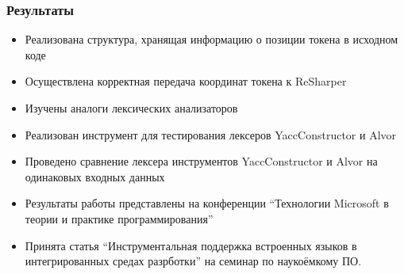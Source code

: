 \documentclass{beamer}
\begin{document}
\begin{frame}%
	\transwipe[direction=90]
	\frametitle{Результаты}
	\begin{itemize}
		\item Реализована структура, хранящая информацию о позиции токена в исходном коде
        \item Осуществлена корректная передача координат токена к ReSharper
        \item Изучены аналоги лексических анализаторов
		\item Реализован инструмент для тестирования лексеров YaccConstructor и Alvor
        \item Проведено сравнение лексера инструментов YaccConstructor и Alvor на одинаковых входных данных
        \item Результаты работы представлены на конференции “Технологии Microsoft в теории и практике программирования”
        \item Принята статья “Инструментальная поддержка встроенных языков в интегрированных средах разрботки” на семинар по наукоёмкому ПО.
	\end{itemize}
\end{frame}
\end{document}
